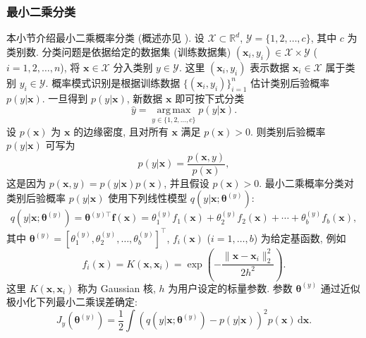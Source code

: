 \subsubsection{{最小二乘分类}}\label{subsec:least-squares-classification}
{本小节介绍最小二乘概率分类  (概述亦见 ).}
{设 $\mathcal{X}\subset\mathbb{R}^d$, $\mathcal{Y}=\{1,2,\ldots,c\}$, 其中 $c$ 为类别数. 分类问题是依据给定的数据集 (训练数据集) $(\boldsymbol{x}_i,y_i)\in\mathcal{X}\times\mathcal{Y}$ ($i=1,2,\ldots,n$), 将 $\boldsymbol{x}\in\mathcal{X}$ 分入类别 $y\in\mathcal{Y}$. 这里 $(\boldsymbol{x}_i,y_i)$ 表示数据 $\boldsymbol{x}_i\in\mathcal{X}$ 属于类别 $y_i\in\mathcal{Y}$.}
{概率模式识别是根据训练数据 $\{(\boldsymbol{x}_i,y_i)\}_{i=1}^n$ 估计类别后验概率 $p(y|\boldsymbol{x})$. 一旦得到 $p(y|\boldsymbol{x})$, 新数据 $\boldsymbol{x}$ 即可按下式分类}
\[\widehat y=\operatorname*{arg\,max}_{y\in\{1,2,\ldots,c\}}p(y|\boldsymbol{x}).\]
{设 $p(\boldsymbol{x})$ 为 $\boldsymbol{x}$ 的边缘密度, 且对所有 $\boldsymbol{x}$ 满足 $p(\boldsymbol{x})>0$. 则类别后验概率 $p(y|\boldsymbol{x})$ 可写为}
\begin{equation}\label{eq:class-posterior-probability}
p(y|\boldsymbol{x})=\frac{p(\boldsymbol{x},y)}{p(\boldsymbol{x})},
\end{equation}
{这是因为 $p(\boldsymbol{x},y)=p(y|\boldsymbol{x})p(\boldsymbol{x})$, 并且假设 $p(\boldsymbol{x})>0$. 最小二乘概率分类对类别后验概率 $p(y|\boldsymbol{x})$ 使用下列线性模型 $q(y|\boldsymbol{x};\boldsymbol{\theta}^{(y)})$:}
\begin{equation}\label{eq:classification-basis-model}
q(y|\boldsymbol{x};\boldsymbol{\theta}^{(y)})=\boldsymbol{\theta}^{(y)\top}\boldsymbol{f}(\boldsymbol{x})=\theta_1^{(y)}f_1(\boldsymbol{x})+\theta_2^{(y)}f_2(\boldsymbol{x})+\cdots+\theta_b^{(y)}f_b(\boldsymbol{x}),
\end{equation}
{其中 $\boldsymbol{\theta}^{(y)}=[\theta_1^{(y)},\theta_2^{(y)},\ldots,\theta_b^{(y)}]^{\top}$, $f_i(\boldsymbol{x})$ ($i=1,\ldots,b$) 为给定基函数, 例如}
\begin{equation}\label{eq:classification-gaussian-kernel}
f_i(\boldsymbol{x})=K(\boldsymbol{x},\boldsymbol{x}_i)=\exp\left(-\frac{\|\boldsymbol{x}-\boldsymbol{x}_i\|_2^2}{2h^2}\right).
\end{equation}
{这里 $K(\boldsymbol{x},\boldsymbol{x}_i)$ 称为 Gaussian 核, $h$ 为用户设定的标量参数. 参数 $\boldsymbol{\theta}^{(y)}$ 通过近似极小化下列最小二乘误差确定:}
\[J_y(\boldsymbol{\theta}^{(y)})=\frac12\int\left(q(y|\boldsymbol{x};\boldsymbol{\theta}^{(y)})-p(y|\boldsymbol{x})\right)^2p(\boldsymbol{x})\,\mathrm d\boldsymbol{x}.\]
